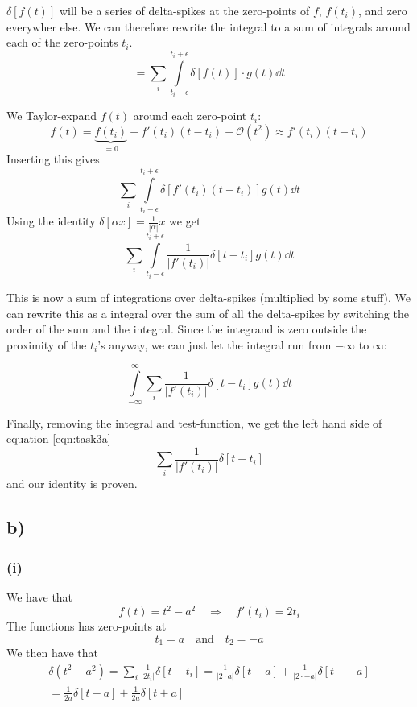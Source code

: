 \documentclass[10pt,a4paper]{article}
\newcommand{\infint}{\int\limits_{-\infty}^{\infty}}
\begin{document}
$\delta[f(t)]$ will be a series of delta-spikes at the zero-points of $f$, $f(t_i)$, and zero everywher else. We can therefore rewrite the integral to a sum of integrals around each of the zero-points $t_i$.
\begin{equation}
    = \sum_i \int\limits_{t_i - \epsilon}^{t_i+\epsilon} \delta[f(t)]\cdot g(t) \dd{t}
\end{equation}

We Taylor-expand $f(t)$ around each zero-point $t_i$:
\begin{equation}
    f(t) = \underbrace{f(t_i)}_{=0} + f'(t_i)(t-t_i) + \mathcal{O}(t^2) \approx f'(t_i)(t-t_i)
\end{equation}
Inserting this gives
\begin{equation}
    \sum_i \int\limits_{t_i - \epsilon}^{t_i+\epsilon} \delta[f'(t_i)(t-t_i)]g(t)\dd{t}
\end{equation}
Using the identity $\delta[\alpha x] = \frac{1}{|\alpha|}x$ we get
\begin{equation}
    \sum_i \int\limits_{t_i - \epsilon}^{t_i+\epsilon} \frac{1}{|f'(t_i)|}\delta[t-t_i]g(t)\dd{t}
\end{equation}

This is now a sum of integrations over delta-spikes (multiplied by some stuff). We can rewrite this as a integral over the sum of all the delta-spikes by switching the order of the sum and the integral. Since the integrand is zero outside the proximity of the $t_i$'s anyway, we can just let the integral run from $-\infty$ to $\infty$:

\begin{equation}
    \infint \sum_i \frac{1}{|f'(t_i)|}\delta[t-t_i]g(t)\dd{t}
\end{equation}


Finally, removing the integral and test-function, we get the left hand side of equation \ref{eqn:task3a}
\begin{equation}
    \sum_i \frac{1}{|f'(t_i)|} \delta[t-t_i]
\end{equation}
and our identity is proven.




\subsection*{b)}
\subsubsection*{(i)}
We have that
\begin{equation}
    f(t) = t^2 - a^2 \quad\Rightarrow\quad f'(t_i) = 2t_i
\end{equation}
The functions has zero-points at
\begin{equation}
    t_1 = a \quad \text{and} \quad t_2 = -a
\end{equation}
We then have that
\begin{align}
    \delta(t^2-a^2) = \sum_i \frac{1}{|2t_i|}\delta[t-t_i] 
    = \frac{1}{|2\cdot a|} \delta[t-a] + \frac{1}{|2\cdot -a|} \delta[t--a] \\
    = \frac{1}{2a}\delta[t-a] + \frac{1}{2a}\delta[t+a]
\end{align}
\end{document}
